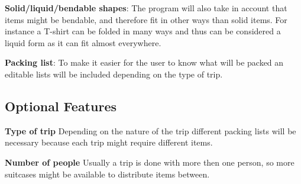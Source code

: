 \textbf{Solid/liquid/bendable shapes}:
The program will also take in account that items might be bendable, and therefore fit in other ways than solid items. For instance a T-shirt can be folded in many ways and thus can be considered a liquid form as it can fit almost everywhere.
\newline

\textbf{Packing list}:
To make it easier for the user to know what will be packed an editable lists will be included depending on the type of trip.
\newline


\subsection{Optional Features}

\textbf{Type of trip}
Depending on the nature of the trip different packing lists will be necessary because each trip might require different items.
\newline

\textbf{Number of people}
Usually a trip is done with more then one person, so more suitcases might be available to distribute items between.
\newline